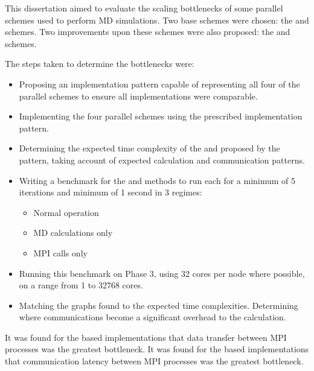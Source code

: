 %
This dissertation aimed to evaluate the scaling bottlenecks of
some parallel schemes used to perform \twobody{} MD simulations.
%
Two base schemes were chosen:
the \replicateddata{} and \systolicloop{} schemes.
Two improvements upon these schemes were also proposed:
the \sharedandreplicateddata{} and \replicatedsystolicloop{} schemes.

The steps taken to determine the bottlenecks were:
\begin{itemize}
\item
    Proposing an implementation pattern capable of representing
    all four of the parallel schemes to ensure all implementations
    were comparable.

\item
    Implementing the four parallel schemes using the prescribed
    implementation pattern.

\item
    Determining the expected time complexity of the
    \individualoperation{} and \pairoperation{} proposed by
    the pattern, taking
    account of expected calculation and communication patterns.

\item
    Writing a benchmark for the
    \individualoperation{} and \pairoperation{} methods
    to run each for a minimum of 5 iterations and minimum of 1 second
    in 3 regimes:
    \begin{itemize}
        \item Normal operation
        \item MD calculations only
        \item MPI calls only
    \end{itemize}

\item
    Running this benchmark on \hector{} Phase 3, using 32 cores per node
    where possible, on a range from 1 to 32768 cores.

\item
    Matching the graphs found to the expected time complexities.
    Determining where communications become a significant overhead
    to the calculation.

\end{itemize}

It was found for the \replicateddata{} based implementations that
data transfer between MPI processes was the greatest bottleneck.
%
It was found for the \systolicloop{} based implementations that
communication latency between MPI processes was the greatest bottleneck.
